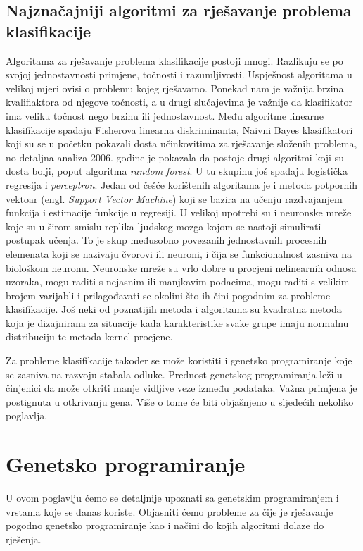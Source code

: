 \documentclass[times, utf8, zavrsni]{fer}
\begin{document}
\section{Najznačajniji algoritmi za rješavanje problema klasifikacije}
Algoritama za rješavanje problema klasifikacije postoji mnogi. Razlikuju se po svojoj jednostavnosti primjene, točnosti i razumljivosti. Uspješnost algoritama u velikoj mjeri ovisi o problemu kojeg rješavamo. Ponekad nam je važnija brzina kvalifiaktora od njegove točnosti, a u drugi slučajevima je važnije da klasifikator ima veliku točnost nego brzinu ili jednostavnost. Među algoritme linearne klasifikacije spadaju Fisherova linearna diskriminanta, Naivni Bayes klasifikatori koji su se u početku pokazali dosta učinkovitima za rješavanje složenih problema, no detaljna analiza 2006. godine je pokazala da postoje drugi algoritmi koji su dosta bolji, poput algoritma \textit{random forest}. U tu skupinu još spadaju logistička regresija i \textit{perceptron}. Jedan od češće korištenih algoritama je i metoda potpornih vektoar (engl. \textit{Support Vector Machine}) koji se bazira na učenju razdvajanjem funkcija i estimacije funkcije u regresiji. U velikoj upotrebi su i neuronske mreže koje su u širom smislu replika ljudskog mozga kojom se nastoji simulirati postupak učenja. To je skup međusobno povezanih jednostavnih procesnih elemenata koji se nazivaju čvorovi ili neuroni, i čija se funkcionalnost zasniva na biološkom neuronu. Neuronske mreže su vrlo dobre u procjeni nelinearnih odnosa uzoraka, mogu raditi s nejasnim ili manjkavim podacima, mogu raditi s velikim brojem varijabli i prilagođavati se okolini što ih čini pogodnim za probleme klasifikacije. Još neki od poznatijih metoda i algoritama su kvadratna metoda koja je dizajnirana za situacije kada karakteristike svake grupe imaju normalnu distribuciju te metoda kernel procjene.

Za probleme klasifikacije također se može koristiti i genetsko programiranje koje se zasniva na razvoju stabala odluke. Prednost genetskog programiranja leži u činjenici da može otkriti manje vidljive veze između podataka. Važna primjena je postignuta u otkrivanju gena. Više o tome će biti objašnjeno u sljedećih nekoliko poglavlja.


\chapter{Genetsko programiranje}
U ovom poglavlju ćemo se detaljnije upoznati sa genetskim programiranjem i vrstama koje se danas koriste. Objasniti ćemo probleme za čije je rješavanje pogodno genetsko programiranje kao i načini do kojih algoritmi dolaze do rješenja.
\end{document}
